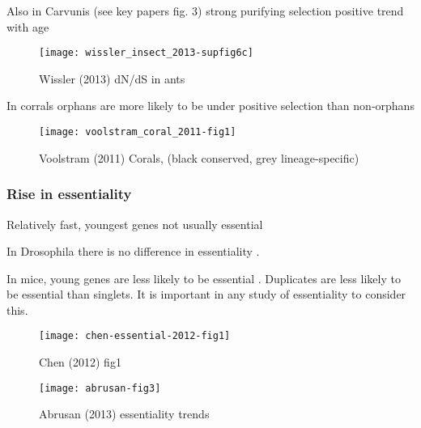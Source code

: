        Also in Carvunis (see key papers fig. 3) strong purifying selection
        positive trend with age \cite{carvunis_proto-genes_2012}

        \begin{figure}[h!] \centering
            \texttt{[image: wissler\_insect\_2013-supfig6c]}
            \caption{ Wissler (2013) dN/dS in ants
                \cite{wissler_mechanisms_2013} } \end{figure}

        In corrals orphans are more likely to be under positive selection
        than non-orphans \cite{voolstra_rapid_2011}

        \begin{figure}[h!] \centering
            \texttt{[image: voolstram\_coral\_2011-fig1]}
            \caption{ Voolstram (2011) Corals, (black conserved, grey
                lineage-specific) \cite{voolstra_rapid_2011} } \end{figure}



        \FloatBarrier

    \subsubsection{Rise in essentiality}

        Relatively fast, youngest genes not usually essential
        \cite{abrusan_integration_2013}

        In Drosophila there is no difference in essentiality
        \cite{chen_new_2010}. 

        In mice, young genes are less likely to be essential
        \cite{chen_younger_2012}. Duplicates are less likely to be essential
        than singlets. It is important in any study of essentiality to consider
        this.

        \begin{figure}[h!]
            \centering
            \texttt{[image: chen-essential-2012-fig1]}
            \caption{Chen (2012) fig1 \cite{chen_younger_2012}}
        \end{figure}

        \begin{figure}[h!] \centering
            \texttt{[image: abrusan-fig3]}
            \caption{Abrusan (2013) essentiality trends}
        \end{figure}
        \FloatBarrier


